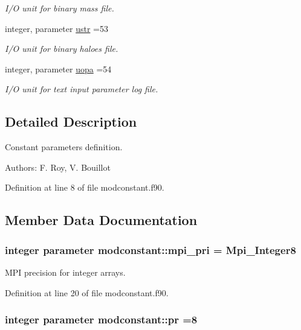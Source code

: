 \begin{DoxyCompactItemize}
\begin{DoxyCompactList}\small\item\em I/\-O unit for binary mass file. \end{DoxyCompactList}\item 
integer, parameter \hyperlink{classmodconstant_a7ad4db4111cceef61b48e40126488f2d}{ustr} =53
\begin{DoxyCompactList}\small\item\em I/\-O unit for binary haloes file. \end{DoxyCompactList}\item 
integer, parameter \hyperlink{classmodconstant_a545e6e3d5c24f9ce81e3f88999f57b41}{uopa} =54
\begin{DoxyCompactList}\small\item\em I/\-O unit for text input parameter log file. \end{DoxyCompactList}\end{DoxyCompactItemize}


\subsection{Detailed Description}
Constant parameters definition. 

Authors\-: F. Roy, V. Bouillot 

Definition at line 8 of file modconstant.\-f90.



\subsection{Member Data Documentation}
\hypertarget{classmodconstant_a4c7b1b69a38bfb69c932e4a770dae783}{
\subsubsection[{mpi\-\_\-pri}]{\setlength{\rightskip}{0pt plus 5cm}integer parameter modconstant\-::mpi\-\_\-pri = Mpi\-\_\-\-Integer8}}\label{classmodconstant_a4c7b1b69a38bfb69c932e4a770dae783}


M\-P\-I precision for integer arrays. 



Definition at line 20 of file modconstant.\-f90.

\hypertarget{classmodconstant_a54966a555666da051c8c851545e11ff7}{
\subsubsection[{pr}]{\setlength{\rightskip}{0pt plus 5cm}integer parameter modconstant\-::pr =8}}\label{classmodconstant_a54966a555666da051c8c851545e11ff7}


